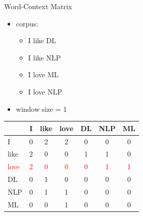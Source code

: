 \begin{frame}{Word-Context Matrix}
\begin{itemize}
    \item corpus:
\begin{itemize}
    \item I like DL
    \item I like NLP
    \item I love ML
    \item I love NLP
\end{itemize}
\item window size = 1

\end{itemize}
{
\begin{table}[!h]
    \centering
    \begin{tabular}{l|cccccc}
          &  I & like & love & DL & NLP &ML  \\
          \hline
         I & 0 & 2 & 2 & 0 &0 &0  \\
         \textcolor{myblue}{like} & \textcolor{myblue}{2} & \textcolor{myblue}{0} & \textcolor{myblue}{0} & \textcolor{myblue}{1} & \textcolor{myblue}{1} & \textcolor{myblue}{0} \\
         \textcolor{red}{love} & \textcolor{red}{2} & \textcolor{red}{0} & \textcolor{red}{0} & \textcolor{red}{0} & \textcolor{red}{1} & \textcolor{red}{1} \\
         DL & 0 & 1 & 0 & 0 & 0 & 0 \\
         NLP & 0 & 1 & 1 & 0 & 0  & 0\\
         ML & 0 & 0 & 1 & 0 & 0 & 0\\
         \hline
    \end{tabular}
\end{table}
}
\end{frame}

